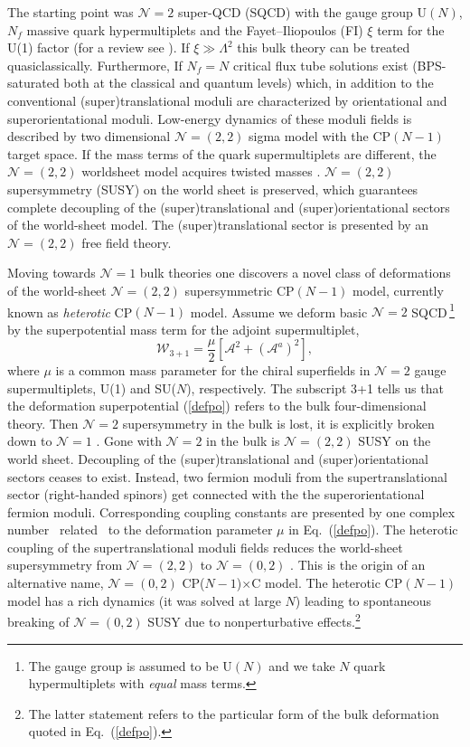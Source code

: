 \documentclass[12pt]{article}
\def\beq{\begin{equation}}
\def\eeq{\end{equation}}
\newcommand{\ntwo}{${\mathcal N}=2$ }
\newcommand{\ntwot}{${\mathcal N}= \left(2,2\right) $ }
\newcommand{\ntwoo}{${\mathcal N}= \left(0,2\right) $ }
\newcommand{\none}{${\mathcal N}=1$ }
\newcommand{\CPC}{CP($N-1$)$\times$C }
\begin{document}
The starting point was \cite{ABEKY,SYmon,HT2} \ntwo super-QCD (SQCD) with the gauge group U$(N)$,
$N_f$ massive quark hypermultiplets and the Fayet--Iliopoulos (FI) $\xi$ term for the U(1) factor
(for a review see \cite{SYrev}). If $\xi\gg\Lambda^2$
this bulk theory can be treated quasiclassically. Furthermore, 
If $N_f=N$  critical flux tube solutions exist (BPS-saturated both
at the classical and quantum levels) which, in addition to the conventional
(super)translational moduli are characterized by orientational and superorientational moduli.
Low-energy dynamics of these moduli fields is described by
two dimensional \ntwot sigma model with the CP$(N-1)$ target space. If the mass terms of 
the quark supermultiplets are different, the \ntwot worldsheet model acquires twisted masses
\cite{twisted}. \ntwot supersymmetry (SUSY) on the world sheet is preserved, which guarantees
complete decoupling of the (super)translational and (super)orientational sectors
of the world-sheet model. The (super)translational sector is presented by an \ntwot free field
theory.

Moving towards \none bulk theories one discovers \cite{Edalati,SYhet,BSYhet}
 a novel class of deformations
of the world-sheet \ntwot supersymmetric CP$(N-1)$ model, currently known as 
{\em heterotic} CP$(N-1)$ model. Assume we deform  basic \ntwo SQCD\,\footnote{
The  gauge group is assumed to be U$(N)$ and we take $N$   quark hypermultiplets
with {\em equal} mass terms.}
 by the superpotential mass term for the adjoint supermultiplet,
\beq
{\mathcal W}_{3+1}=\frac{\mu}{2} \left[{\mathcal A}^2
+  ({\mathcal A}^a)^2\right],
\label{defpo}
\eeq
where $\mu$ is a common mass parameter for the chiral
superfields in \ntwo gauge supermultiplets,
U(1) and SU($N$), respectively. The subscript 3+1 tells us that the deformation 
superpotential (\ref{defpo}) refers to the bulk four-dimensional theory.
Then \ntwo supersymmetry in the bulk is lost, it is explicitly broken down to \none$\!\!$.
Gone with \ntwo in the bulk is \ntwot SUSY on the world sheet.
Decoupling of the (super)translational and (super)orientational sectors ceases to exist. 
Instead, two fermion moduli from the supertranslational sector (right-handed spinors)
get connected with the the superorientational fermion moduli.
Corresponding coupling constants are  presented by one complex number~ \cite{Edalati}
related~\cite{SYhet,BSYhet} to the deformation parameter $\mu$
in Eq.~(\ref{defpo}).
The heterotic coupling of the
supertranslational moduli fields reduces the world-sheet supersymmetry from
\ntwot to \ntwoo$\!\!$.
This is the origin of an alternative name,
 \ntwoo \CPC model. The heterotic CP$(N-1)$ model has a rich dynamics (it was solved \cite{SYhetlN}
 at large $N$) leading to spontaneous breaking of 
 \ntwoo SUSY due to nonperturbative effects.\footnote{The latter statement refers to the particular
 form of the bulk deformation quoted in Eq.~(\ref{defpo}).} 
 
\end{document}

